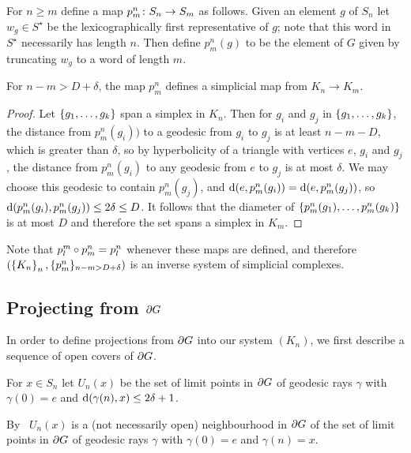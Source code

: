 \documentclass[a4paper]{article}
\begin{document}
\begin{definition}
  For $n \geq m$ define a map $p^n_m \colon S_n \to S_m$ as follows.
  Given an element $g$ of $S_n$ let $w_g \in S^\star$ be the lexicographically
  first representative of $g$; note that this word in $S^\star$ necessarily has
  length $n$.  Then define $p^n_m(g)$ to be the element of $G$ given by
  truncating $w_g$ to a word of length $m$.
\end{definition}

\begin{lemma}\label{lem:psimplicial}
  For $n - m > D + \delta$, the map $p^n_m$ defines a simplicial map from
  $K_n \to K_m$.
\end{lemma}

\begin{proof}
  Let $\left\{g_1, \dotsc, g_k\right\}$ span a simplex in $K_n$.  Then for $g_i$ and
  $g_j$ in $\left\{g_1, \dotsc, g_k\right\}$, the distance from $p^n_m(g_i))$ to a
  geodesic from $g_i$ to $g_j$ is at least $n - m - D$, which is greater than
  $\delta$, so by hyperbolicity of a triangle with vertices $e$, $g_i$ and $g_j$,
  the distance from $p^n_m(g_i)$ to any geodesic from $e$ to $g_j$ is at most
  $\delta$. We may choose this geodesic to contain $p^n_m(g_j)$, and $\operatorname{d}(e,
  p^n_m(g_i)) = \operatorname{d}(e, p^n_m(g_j))$, so $\operatorname{d}(p^n_m(g_i), p^n_m(g_j)) \leq
  2\delta \leq D$.  It follows that the diameter of $\left\{p^n_m(g_1), \dotsc,
  p^n_m(g_k)\right\}$ is at most $D$ and therefore the set spans a simplex in $K_m$.
\end{proof}

Note that $p^m_l \circ p^n_m = p^n_l$ whenever these maps are defined, and 
therefore $(\left\{K_n\right\}_n, \{p^n_m\}_{n - m > D + \delta})$ is an inverse system 
of simplicial complexes.

\subsection{Projecting from $\partial G$}

In order to define projections from $\partial G$ into our system $(K_n)$, we
first describe a sequence of open covers of $\partial G$.

\begin{definition}
  For $x \in S_n$ let $U_n(x)$ be the set of limit points in $\partial G$ of 
  geodesic rays $\gamma$ with $\gamma(0) = e$ and $\operatorname{d}(\gamma(n), x) \leq 
  2\delta+1$.  
  
  By~\cite[III.H.3.6]{bridsonhaefliger99} $U_n(x)$ is a (not necessarily open)
  neighbourhood in $\partial G$ of the set of limit points in $\partial G$ of
  geodesic rays $\gamma$ with $\gamma(0) = e$ and $\gamma(n) = x$.
\end{definition}
\end{document}
